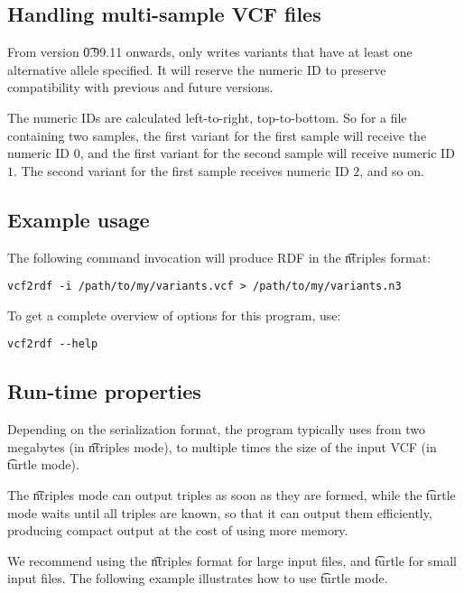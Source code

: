 \subsection{Handling multi-sample VCF files}

  From version \t{0.99.11} onwards,  only writes variants
  that have at least one alternative allele specified.  It will reserve the
  numeric ID to preserve compatibility with previous and future versions.

  The numeric IDs are calculated left-to-right, top-to-bottom.  So for a file
  containing two samples, the first variant for the first sample will receive
  the numeric ID $0$, and the first variant for the second sample will receive
  numeric ID $1$.  The second variant for the first sample receives numeric ID
  $2$, and so on.

\subsection{Example usage}

The following command invocation will produce RDF in the \t{ntriples}
format:
\begin{siderules}
\begin{verbatim}
vcf2rdf -i /path/to/my/variants.vcf > /path/to/my/variants.n3
\end{verbatim}
\end{siderules}

To get a complete overview of options for this program, use:
\begin{siderules}
\begin{verbatim}
vcf2rdf --help
\end{verbatim}
\end{siderules}

\subsection{Run-time properties}

  Depending on the serialization format, the program typically uses from two megabytes
  (in \t{ntriples} mode), to multiple times the size of the input VCF
  (in \t{turtle} mode).

  The \t{ntriples} mode can output triples as soon as they are formed, while the
  \t{turtle} mode waits until all triples are known, so that it can output them
  efficiently, producing compact output at the cost of using more memory.

  We recommend using the \t{ntriples} format for large input files, and
  \t{turtle} for small input files.  The following example illustrates how to
  use \t{turtle} mode.

